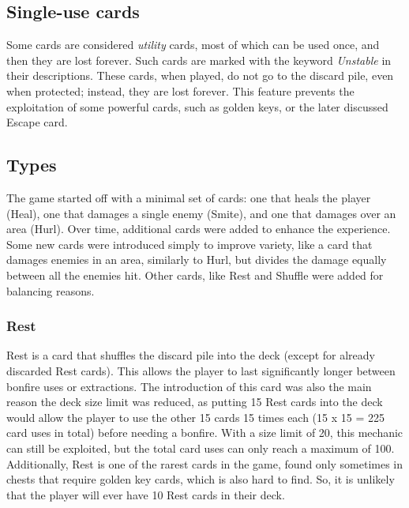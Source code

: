 \subsection{Single-use cards}

Some cards are considered \textit{utility} cards, most of which can be used once, and then they are lost forever. Such cards are marked with the keyword \textit{Unstable} in their descriptions. These cards, when played, do not go to the discard pile, even when protected; instead, they are lost forever. This feature prevents the exploitation of some powerful cards, such as golden keys, or the later discussed Escape card.



\subsection{Types}

The game started off with a minimal set of cards: one that heals the player (Heal), one that damages a single enemy (Smite), and one that damages over an area (Hurl). Over time, additional cards were added to enhance the experience. Some new cards were introduced simply to improve variety, like a card that damages enemies in an area, similarly to Hurl, but divides the damage equally between all the enemies hit. Other cards, like Rest and Shuffle were added for balancing reasons.



\subsubsection{Rest}

Rest is a card that shuffles the discard pile into the deck (except for already discarded Rest cards). This allows the player to last significantly longer between bonfire uses or extractions. The introduction of this card was also the main reason the deck size limit was reduced, as putting 15 Rest cards into the deck would allow the player to use the other 15 cards 15 times each (15 x 15 = 225 card uses in total) before needing a bonfire. With a size limit of 20, this mechanic can still be exploited, but the total card uses can only reach a maximum of 100. Additionally, Rest is one of the rarest cards in the game, found only sometimes in chests that require golden key cards, which is also hard to find. So, it is unlikely that the player will ever have 10 Rest cards in their deck.



